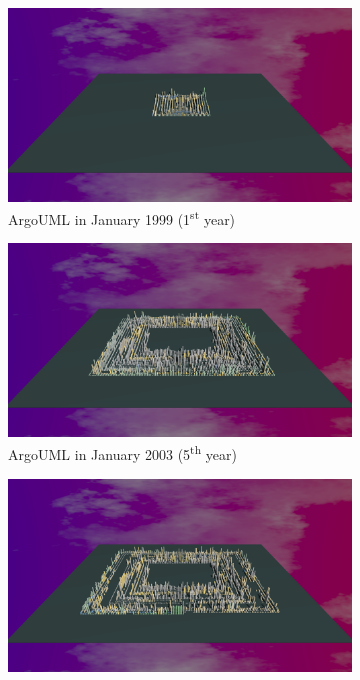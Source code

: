 \begin{figure}[ht]
    \begin{subfigure}{0.48\textwidth}
        \includegraphics[width=\linewidth]{ArgoUML/Animation001.png}
        \caption{ArgoUML in January 1999 (1\textsuperscript{st} year)} 
        \label{fig:ArgoUML_V3_S1}
    \end{subfigure}\hspace*{\fill}
    \begin{subfigure}{0.48\textwidth}
        \includegraphics[width=\linewidth]{ArgoUML/Animation005.png}
        \caption{ArgoUML in January 2003 (5\textsuperscript{th} year)} 
        \label{fig:ArgoUML_V3_S2}
    \end{subfigure}
    \medskip
    \begin{subfigure}{0.48\textwidth}
        \includegraphics[width=\linewidth]{ArgoUML/Animation006.png}

\end{subfigure}
\end{figure}
